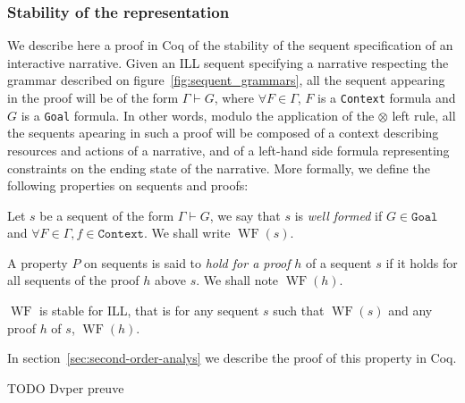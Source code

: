 \documentclass[runningheads,a4paper]{llncs}
\DeclareMathOperator{\wf}{WF}
\begin{document}
\subsubsection{Stability of the representation}

We describe here a proof in Coq of the stability of the sequent specification of an interactive narrative. Given an ILL sequent specifying a narrative respecting the grammar described on figure~\ref{fig:sequent_grammars}, all the sequent appearing in the proof will be of the form $\Gamma\vdash G $, where $\forall F\in\Gamma$, $F$ is a \texttt{Context} formula and $G$ is a \texttt{Goal} formula. In other words, modulo the application of the $\otimes$ left rule, all the sequents apearing in such a proof will be composed of a context describing resources and actions of a narrative, and of a left-hand side formula representing constraints on the ending state of the narrative.
More formally, we define the following properties on sequents and
proofs:
\begin{definition}
  Let $s$ be a sequent of the form $\Gamma\vdash G$, we say that $s$
  is \emph{well formed} if $G\in\texttt{Goal}$ and $\forall
  F\in\Gamma, f \in \texttt{Context}$. We shall write $\wf(s)$.
\end{definition}
\begin{definition}
  A property $P$ on sequents is said to \emph{hold for a proof} $h$ of
  a sequent $s$ if it holds for all sequents of the proof $h$ above
  $s$. We shall note $\wf(h)$.
\end{definition}
\begin{definition}\label{def:stab}
  $\wf$ is stable for ILL, that is for any sequent $s$ such that
  $\wf(s)$ and any proof $h$ of $s$, $\wf(h)$.
\end{definition}
In section~\ref{sec:second-order-analys} we describe the proof of
this property in Coq.


TODO Dvper preuve
\end{document}
